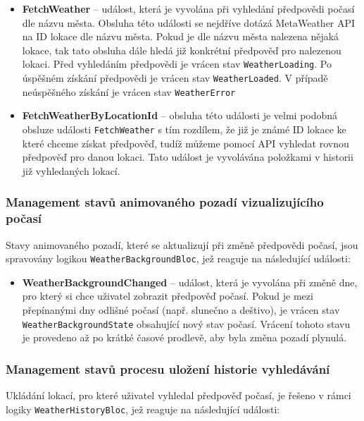 \documentclass[12pt, a4paper]{article}
\begin{document}
\begin{itemize}
	\item \textbf{FetchWeather} -- událost, která je vyvolána při vyhledání předpovědi počasí dle názvu města. Obsluha této události se nejdříve dotázá MetaWeather API na ID lokace dle názvu města. Pokud je dle názvu města nalezena nějaká lokace, tak tato obsluha dále hledá již konkrétní předpověď pro nalezenou lokaci. Před vyhledáním předpovědi je vrácen stav \texttt{WeatherLoading}. Po úspěšném získání předpovědi je vrácen stav \texttt{WeatherLoaded}. V případě neúspěšného získání je vrácen stav \texttt{WeatherError}
	\item \textbf{FetchWeatherByLocationId} -- obsluha této události je velmi podobná obsluze události \texttt{FetchWeather} s tím rozdílem, že již je známé ID lokace ke které chceme získat předpověď, tudíž můžeme pomocí API vyhledat rovnou předpověď pro danou lokaci. Tato událost je vyvolávána položkami v historii již vyhledaných lokací.

\end{itemize}

\subsubsection{Management stavů animovaného pozadí vizualizujícího počasí}

Stavy animovaného pozadí, které se aktualizují při změně předpovědi počasí, jsou spravovány logikou \texttt{WeatherBackgroundBloc}, jež reaguje na následující události:

\begin{itemize}

	\item \textbf{WeatherBackgroundChanged} -- událost, která je vyvolána při změně dne, pro který si chce uživatel zobrazit předpověď počasí. Pokud je mezi přepínanými dny odlišné počasí (např. slunečno a deštivo), je vrácen stav \texttt{WeatherBackgroundState} obsahující nový stav počasí. Vrácení tohoto stavu je provedeno až po krátké časové prodlevě, aby byla změna pozadí plynulá.

\end{itemize}


\subsubsection{Management stavů procesu uložení historie vyhledávání}

Ukládání lokací, pro které uživatel vyhledal předpověď počasí, je řešeno v rámci logiky \texttt{WeatherHistoryBloc}, jež reaguje na následující události:
\end{document}
